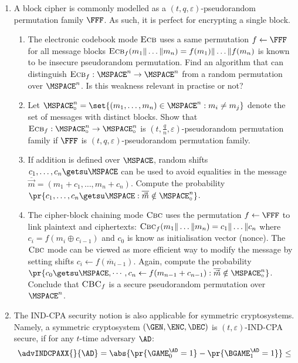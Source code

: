 \documentclass{article}
\begin{document}
\begin{enumerate}
\item A block cipher is commonly modelled as a
  $(t,q,\varepsilon)$-pseudorandom permutation family $\FFF$. As
  such, it is perfect for encrypting a single block.
  \begin{enumerate}
  \item The electronic codebook mode $\textsc{Ecb}$ uses a same
    permutation $f\gets\FFF$ for all message blocks
    $\textsc{Ecb}_f(m_1\|\ldots\|m_n)= f(m_1)\|\ldots\| f(m_n)$ is
    known to be insecure pseudorandom permutation.  Find an algorithm
    that can distinguish $\textsc{Ecb}_f:\MSPACE^n\to\MSPACE^n$ from a
    random permutation over $\MSPACE^n$. Is this weakness relevant in
    practise or not?
  \item Let $\MSPACE_\circ^n=\set{(m_1,\ldots,m_n)\in\MSPACE^n:
      m_i\neq m_j}$ denote the set of messages with distinct
    blocks. Show that
    $\textsc{Ecb}_f:\MSPACE_\circ^n\to\MSPACE_\circ^n$ is
    $(t,\frac{q}{n},\varepsilon)$-pseudorandom permutation family if
    $\FFF$ is $(t,q,\varepsilon)$-pseudorandom permutation family.
  \item If addition is defined over $\MSPACE$, random shifts
    $c_1,\ldots,c_n\getsu\MSPACE$ can be used to avoid equalities in
    the message $\overline{\vec{m}}=(m_1+c_1,\ldots,m_n+c_n)$. Compute
    the probability $\pr{c_1,\ldots,c_n\getsu\MSPACE:
      \overline{\vec{m}}\notin\MSPACE_\circ^n}$.
  \item The cipher-block chaining mode $\textsc{Cbc}$ uses the
    permutation $f\gets\FFF$ to link plaintext and ciphertexts:
    $\textsc{Cbc}_f(m_1\|\ldots\|m_n)= c_1\|\ldots\|c_n$ where
    $c_i=f(m_i\oplus c_{i-1})$ and $c_0$ is know as initialisation
    vector (nonce).  The $\textsc{Cbc}$ mode can be viewed as more
    efficient way to modify the message by setting shifts $c_{i}\gets
    f(\overline{m}_{i-1})$. Again, compute the probability
    $\pr{c_0\getsu\MSPACE,\cdots, c_n\gets
      f(m_{n-1}+c_{n-1}):\overline{\vec{m}}\notin\MSPACE_\circ^n}$.
    Conclude that $\textsc{CBC}_f$ is a secure pseudorandom
    permutation over $\MSPACE^n$.
  \end{enumerate}
\item The IND-CPA security notion is also applicable for symmetric
  cryptosystems. Namely, a symmetric cryptosystem $(\GEN,\ENC,\DEC)$
  is $(t,\varepsilon)$-IND-CPA secure, if for any $t$-time adversary
  $\AD$:
  \begin{align*}
    \advINDCPAXX{}{\AD}=\abs{\pr{\smash{\GAME_0^\AD=1}}-\pr{\smash{\BGAME_1^\AD=1}}}\leq

\end{align*}
\end{enumerate}
\end{document}
